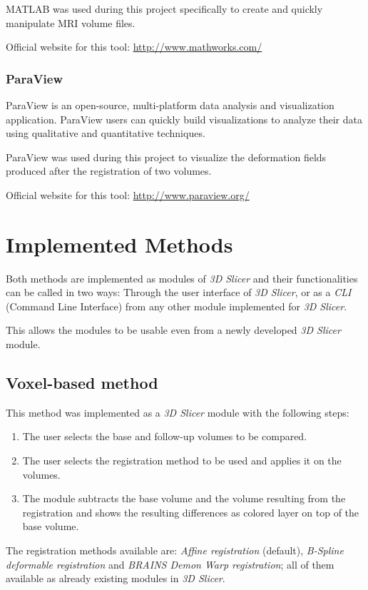 MATLAB was used during this project specifically to create and quickly manipulate MRI volume files.

Official website for this tool: \url{http://www.mathworks.com/}

\subsubsection{ParaView}
ParaView is an open-source, multi-platform data analysis and visualization application. ParaView users can quickly build visualizations to analyze their data using qualitative and quantitative techniques.

ParaView was used during this project to visualize the deformation fields produced after the registration of two volumes.

Official website for this tool: \url{http://www.paraview.org/}

\section{Implemented Methods}
Both methods are implemented as modules of \textit{3D Slicer} and
their functionalities can be called in two ways: Through the user
interface of \textit{3D Slicer}, or as a \textit{CLI} (Command Line
Interface) from any other module implemented for \textit{3D Slicer}.

This allows the modules to be usable even from a newly developed
\textit{3D Slicer} module.

\subsection{Voxel-based method}
This method was implemented as a \textit{3D Slicer} module with the following steps:
\begin{enumerate}
\item The user selects the base and follow-up volumes to be compared.
\item The user selects the registration method to be used and applies it on the volumes.
\item The module subtracts the base volume and the volume resulting
  from the registration and shows the resulting differences as colored
  layer on top of the base volume.
\end{enumerate}

The registration methods available are: \textit{Affine registration}
(default), \textit{B-Spline deformable registration} and
\textit{BRAINS Demon Warp registration}; all of them available as
already existing modules in \textit{3D Slicer}.

